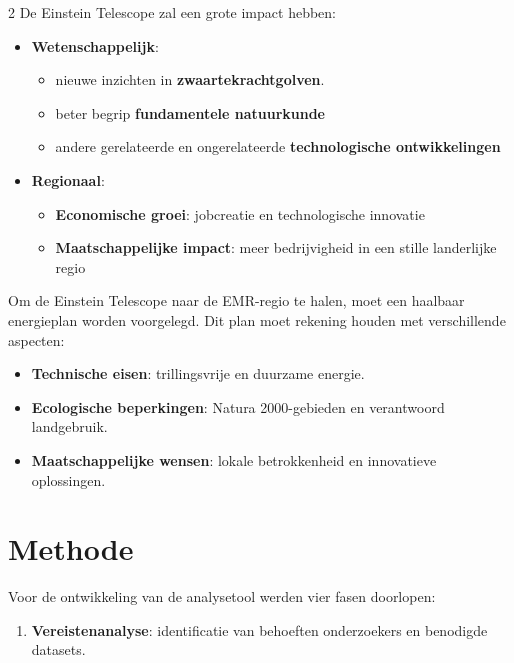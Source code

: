 \documentclass[a0,portrait]{hogent-poster}
\begin{document}
\begin{multicols}{2}
De Einstein Telescope zal een grote impact hebben:

\begin{itemize}
    \item \textcolor{hogent-darkgreen}{\textbf{Wetenschappelijk}}:
    \begin{itemize}
        \item nieuwe inzichten in \textbf{zwaartekrachtgolven}.
        \item beter begrip \textbf{fundamentele natuurkunde}
        \item andere gerelateerde en ongerelateerde \textbf{technologische ontwikkelingen}
    \end{itemize}
    \item \textcolor{hogent-pink}{\textbf{Regionaal}}:
    \begin{itemize}
        \item \textbf{Economische groei}: jobcreatie en technologische innovatie
        \item \textbf{Maatschappelijke impact}: meer bedrijvigheid in een stille landerlijke regio
    \end{itemize}
\end{itemize}
\medskip

Om de Einstein Telescope naar de EMR-regio te halen, moet een haalbaar energie\-plan worden voorgelegd. Dit plan moet rekening houden met verschillende aspecten:
\begin{itemize}
    \item \textcolor{hogent-ochre}{\textbf{Technische eisen}}: trillingsvrije en duurzame energie.
    \item \textcolor{hogent-purple}{\textbf{Ecologische beperkingen}}: Natura 2000-gebieden en verantwoord landgebruik.
    \item \textcolor{hogent-lightgreen}{\textbf{Maatschappelijke wensen}}: lokale betrokkenheid en innovatieve oplossingen.
\end{itemize}

\section{Methode}

Voor de ontwikkeling van de analysetool werden vier fasen doorlopen:

\begin{enumerate}
    \item \textcolor{hogent-brown}{\textbf{Vereistenanalyse}}: identificatie van behoeften onderzoekers en benodigde datasets.
    

\end{enumerate}
\end{multicols}
\end{document}
